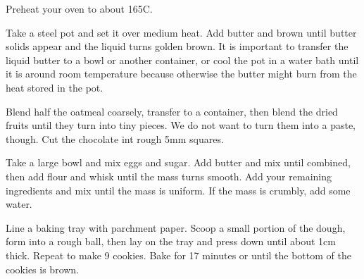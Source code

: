Preheat your oven to about 165C.

Take a steel pot and set it over medium heat. Add butter and brown until butter
solids appear and the liquid turns golden brown. It is important to transfer
the liquid butter to a bowl or another container, or cool the pot in a water
bath until it is around room temperature because otherwise the butter might
burn from the heat stored in the pot.

Blend half the oatmeal coarsely, transfer to a container, then blend the dried
fruits until they turn into tiny pieces. We do not want to turn them into a
paste, though. Cut the chocolate int rough 5mm squares.

Take a large bowl and mix eggs and sugar. Add butter and mix until combined,
then add flour and whisk until the mass turns smooth. Add your remaining
ingredients and mix until the mass is uniform. If the mass is crumbly, add some
water.

Line a baking tray with parchment paper. Scoop a small portion of the dough,
form into a rough ball, then lay on the tray and press down until about 1cm
thick. Repeat to make 9 cookies. Bake for 17 minutes or until the bottom of the
cookies is brown.
